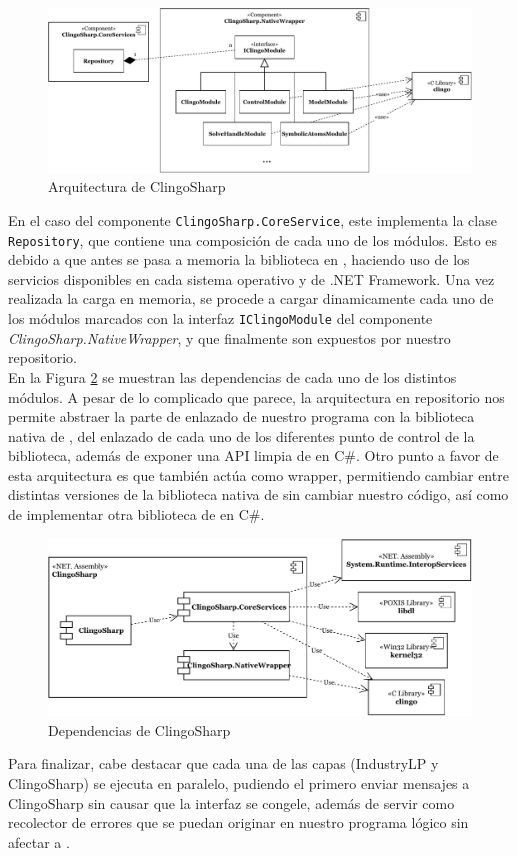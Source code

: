 \begin{figure}[!h]
	\centering
	\includegraphics[width=\textwidth]{images/repository}
	\caption{Arquitectura de ClingoSharp}
	\label{fig:clingosharp-repository}
\end{figure}

En el caso del componente \texttt{ClingoSharp.CoreService}, este implementa la clase \texttt{Repository}, que contiene una composición de cada uno de los módulos. Esto es debido a que antes se pasa a memoria la biblioteca en \clingo, haciendo uso de los servicios disponibles en cada sistema operativo y de .NET Framework. Una vez realizada la carga en memoria, se procede a cargar dinamicamente cada uno de los módulos marcados con la interfaz \texttt{IClingoModule} del componente \textit{ClingoSharp.NativeWrapper}, y que finalmente son expuestos por nuestro repositorio. \\

En la Figura \ref{fig:clingosharp} se muestran las dependencias de cada uno de los distintos módulos. A pesar de lo complicado que parece, la arquitectura en repositorio nos permite abstraer la parte de enlazado de nuestro programa con la biblioteca nativa de \clingo, del enlazado de cada uno de los diferentes punto de control de la biblioteca, además de exponer una API limpia de \clingo en C\#. Otro punto a favor de esta arquitectura es que también actúa como wrapper, permitiendo cambiar entre distintas versiones de la biblioteca nativa de \clingo sin cambiar nuestro código, así como de implementar otra biblioteca de \asp en C\#. \\

\begin{figure}[!h]
	\centering
	\includegraphics[width=\textwidth]{images/clingosharp}
	\caption{Dependencias de ClingoSharp}
	\label{fig:clingosharp}
\end{figure}

Para finalizar, cabe destacar que cada una de las capas (IndustryLP y ClingoSharp) se ejecuta en paralelo, pudiendo el primero enviar mensajes a ClingoSharp sin causar que la interfaz se congele, además de servir como recolector de errores que se puedan originar en nuestro programa lógico sin afectar a \cities.